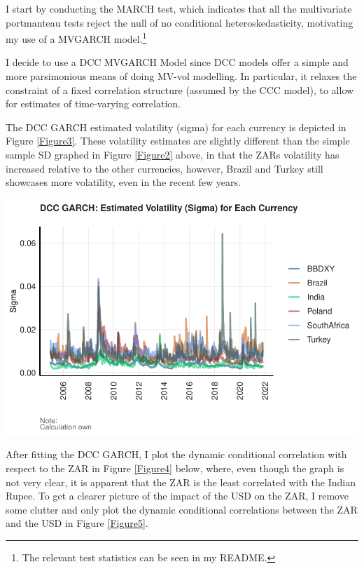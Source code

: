 \documentclass[11pt,preprint, authoryear]{elsarticle}
\let\origfigure\figure
\let\endorigfigure\endfigure
\renewenvironment{figure}[1][2] {
    \expandafter\origfigure\expandafter[H]
} {
    \endorigfigure
}
\numberwithin{equation}{section}
\numberwithin{figure}{section}
\numberwithin{table}{section}
\let\rmarkdownfootnote\footnote%
\def\footnote{\protect\rmarkdownfootnote}
\begin{document}
I start by conducting the MARCH test, which indicates that all the
multivariate portmanteau tests reject the null of no conditional
heteroskedasticity, motivating my use of a MVGARCH model.\footnote{The
  relevant test statistics can be seen in my README.}

I decide to use a DCC MVGARCH Model since DCC models offer a simple and
more parsimonious means of doing MV-vol modelling. In particular, it
relaxes the constraint of a fixed correlation structure (assumed by the
CCC model), to allow for estimates of time-varying correlation.

The DCC GARCH estimated volatility (sigma) for each currency is depicted
in Figure \ref{Figure3}. These volatility estimates are slightly
different than the simple sample SD graphed in Figure \ref{Figure2}
above, in that the ZARs volatility has increased relative to the other
currencies, however, Brazil and Turkey still showcases more volatility,
even in the recent few years.

\begin{figure}[H]

{\centering \includegraphics{Question5_files/figure-latex/TidyVol_plot-1} 

}

\caption{DCC GARCH: Estimated Volatility (Sigma) for Each Currency \label{Figure3}}\label{fig:TidyVol_plot}
\end{figure}

After fitting the DCC GARCH, I plot the dynamic conditional correlation
with respect to the ZAR in Figure \ref{Figure4} below, where, even
though the graph is not very clear, it is apparent that the ZAR is the
least correlated with the Indian Rupee. To get a clearer picture of the
impact of the USD on the ZAR, I remove some clutter and only plot the
dynamic conditional correlations between the ZAR and the USD in Figure
\ref{Figure5}.
\end{document}
